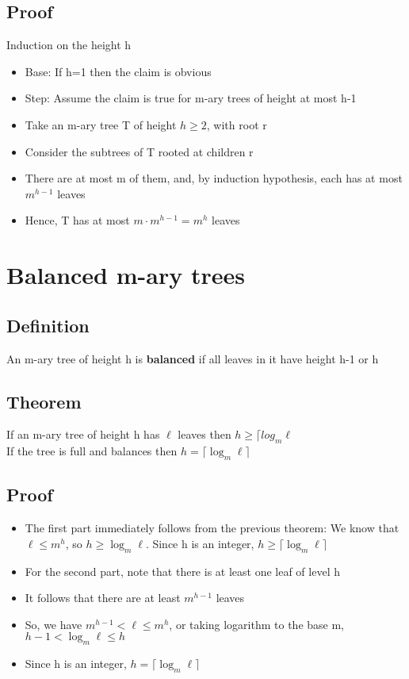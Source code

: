 \documentclass{article}[18pt]
\begin{document}
\subsection{Proof}
Induction on the height h
\begin{itemize}
	\item Base: If h=1 then the claim is obvious
	\item Step: Assume the claim is true for m-ary trees of height at most h-1
	\item Take an m-ary tree T of height $h\geqslant 2$, with root r
	\item Consider the subtrees of T rooted at children r
	\item There are at most m of them, and, by induction hypothesis, each has at most $m^{h-1}$ leaves
	\item Hence, T has at most $m\cdot m^{h-1}=m^h$ leaves
\end{itemize}
\section{Balanced m-ary trees}
\subsection{Definition}
An m-ary tree of height h is \textbf{balanced} if all leaves in it have height h-1 or h
\subsection{Theorem}
If an m-ary tree of height h has $\ell$ leaves then $h\geqslant \lceil log_m\ell$\\
If the tree is full and balances then $h=\lceil \log_m\ell\rceil$
\subsection{Proof}
\begin{itemize}
	\item The first part immediately follows from the previous theorem: We know that $\ell \leqslant m^h$, so $h\geqslant \log_m\ell$. Since h is an integer, $h\geqslant \lceil \log_m\ell \rceil$
	\item For the second part, note that there is at least one leaf of level h
	\item It follows that there are at least $m^{h-1}$ leaves
	\item So, we have $m^{h-1}<\ell\leqslant m^h$, or taking logarithm to the base m, $h-1<\log_m\ell \leqslant h$
	\item Since h is an integer, $h=\lceil \log_m\ell \rceil$
\end{itemize}
\end{document}
